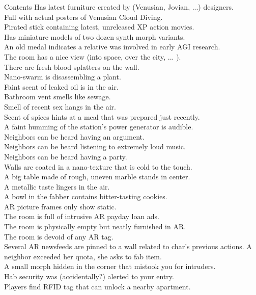 \documentclass[a4]{book}
\begin{document}
\begin{tableone}{Contents}
Has latest furniture created by (Venusian, Jovian, ...) designers.\\
Full with actual posters of Venusian Cloud Diving.\\
Pirated stick containing latest, unreleased XP action movies.\\
Has miniature models of two dozen synth morph variants.\\
An old medal indicates a relative was involved in early AGI research.\\
The room has a nice view (into space, over the city, ... ).\\
There are fresh blood splatters on the wall.\\
Nano-swarm is disassembling a plant.\\
Faint scent of leaked oil is in the air.\\
Bathroom vent smells like sewage.\\
Smell of recent sex hangs in the air.\\
Scent of spices hints at a meal that was prepared just recently.\\
A faint humming of the station's power generator is audible.\\
Neighbors can be heard having an argument.\\
Neighbors can be heard listening to extremely loud music.\\
Neighbors can be heard having a party.\\
Walls are coated in a nano-texture that is cold to the touch.\\
A big table made of rough, uneven marble stands in center.\\
A metallic taste lingers in the air.\\
A bowl in the fabber contains bitter-tasting cookies.\\
AR picture frames only show static.\\
The room is full of intrusive AR payday loan ads.\\
The room is physically empty but neatly furnished in AR.\\
The room is devoid of any AR tag.\\
Several AR newsfeeds are pinned to a wall related to char's previous actions.
A neighbor exceeded her quota, she asks to fab item.\\
A small  morph hidden in the corner that mistook you for intruders.\\
Hab security was (accidentally?) alerted to your entry.\\
Players find RFID tag that can unlock a nearby apartment.\\
\end{tableone}
\end{document}
